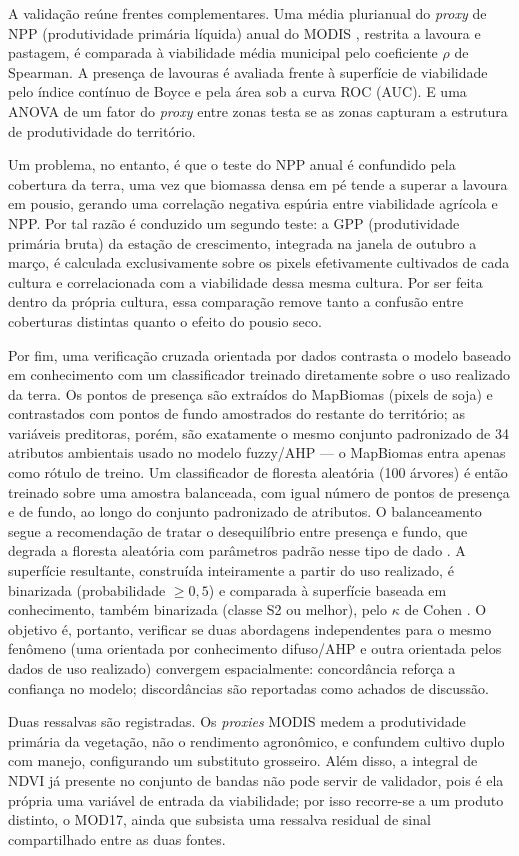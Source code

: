 A validação reúne frentes complementares. Uma média plurianual do \emph{proxy} de NPP (produtividade
primária líquida) anual do MODIS \citep{zhao_improvements_2005}, restrita a lavoura e pastagem, é comparada à
viabilidade média municipal pelo coeficiente $\rho$ de Spearman. A presença de lavouras é avaliada
frente à superfície de viabilidade pelo índice contínuo de Boyce \citep{hirzel_evaluating_2006} e pela área sob
a curva ROC (AUC). E uma ANOVA de um fator do \emph{proxy} entre zonas testa se as zonas capturam a
estrutura de produtividade do território.

Um problema, no entanto, é que o teste do NPP anual é confundido pela cobertura da terra, uma vez que 
biomassa densa em pé tende a superar a lavoura em pousio, gerando uma correlação negativa espúria entre 
viabilidade agrícola e NPP. Por tal razão é conduzido um segundo teste: a GPP (produtividade primária bruta) 
da estação de crescimento, integrada na janela de outubro a março, é calculada exclusivamente sobre os pixels efetivamente
cultivados de cada cultura e correlacionada com a viabilidade dessa mesma cultura. Por ser feita
dentro da própria cultura, essa comparação remove tanto a confusão entre coberturas distintas quanto
o efeito do pousio seco.

Por fim, uma verificação cruzada orientada por dados contrasta o modelo baseado em conhecimento
com um classificador treinado diretamente sobre o uso realizado da terra. Os pontos de presença
são extraídos do MapBiomas (pixels de soja) e contrastados com pontos de fundo amostrados do
restante do território; as variáveis preditoras, porém, são exatamente o mesmo conjunto
padronizado de 34 atributos ambientais usado no modelo fuzzy/AHP --- o MapBiomas entra apenas como
rótulo de treino. Um classificador de floresta aleatória (100 árvores) é então treinado sobre uma amostra balanceada, 
com igual número de pontos de presença e de fundo,
ao longo do conjunto padronizado de atributos. O balanceamento segue a recomendação de tratar o
desequilíbrio entre presença e fundo, que degrada a floresta aleatória com parâmetros padrão nesse
tipo de dado \citep{valavi_modelling_2021}. A superfície resultante, construída inteiramente a
partir do uso realizado, é binarizada (probabilidade $\geq 0{,}5$) e comparada à superfície baseada
em conhecimento, também binarizada (classe S2 ou melhor), pelo $\kappa$ de Cohen
\citep[p.~40, eq.~1]{cohen_coefficient_1960}. O objetivo é, portanto, verificar se duas abordagens independentes para o
mesmo fenômeno (uma orientada por conhecimento difuso/AHP e outra orientada
pelos dados de uso realizado) convergem espacialmente: concordância reforça a confiança no
modelo; discordâncias são reportadas como achados de discussão.

Duas ressalvas são registradas. Os \emph{proxies} MODIS medem a produtividade primária da vegetação,
não o rendimento agronômico, e confundem cultivo duplo com manejo, configurando um substituto
grosseiro. Além disso, a integral de NDVI já presente no conjunto de bandas não pode servir de
validador, pois é ela própria uma variável de entrada da viabilidade; por isso recorre-se a um
produto distinto, o MOD17, ainda que subsista uma ressalva residual de sinal compartilhado entre as
duas fontes.